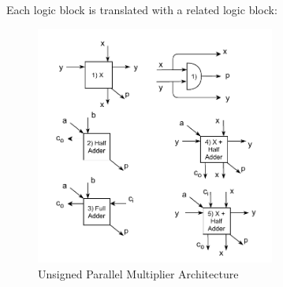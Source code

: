 Each logic block is translated with a related logic block:
\begin{figure}[H]
	\centering
	\includegraphics[width=0.7\textwidth]{img/architecture_parallel_multiplier_meaning.pdf}
	\caption{Unsigned Parallel Multiplier Architecture}
\end{figure}
